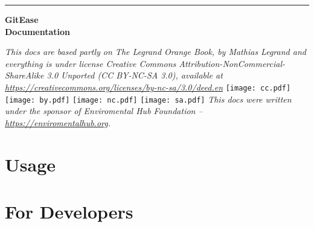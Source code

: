 \documentclass[12pt]{book} %
\begin{document}
\frontmatter

\begin{titlepage} %
	
	\raggedleft %
    \sffamily
    \pagecolor{BlueViolet!55}
    \color{white}
	\rule{3pt}{\textheight} %
	\hspace{0.05\textwidth} %
	\parbox[b]{0.85\textwidth}{ %
		{\fontsize{35}{45}\bfseries GitEase\\[1em] Documentation} %
		
        \vspace{0.5\textheight} %
        
	}

\end{titlepage}

\pagecolor{white}

\rule{0pt}{\textheight}
\newpage
\rule{0pt}{\textheight}
\parbox[b]{0.85\textwidth}{
    \centering
    \emph{This docs are based partly on The Legrand Orange Book, by Mathias Legrand and everything is under license Creative Commons Attribution-NonCommercial-ShareAlike 3.0 Unported (CC BY-NC-SA 3.0), available at \emph{\url{https://creativecommons.org/licenses/by-nc-sa/3.0/deed.en}}}
       \texttt{[image: cc.pdf]} 
       \texttt{[image: by.pdf]} 
       \texttt{[image: nc.pdf]} 
       \texttt{[image: sa.pdf]} 
    \vspace{0.5\textheight} 
    \emph{\vfill This docs were written under the sponsor of Enviromental Hub Foundation -- \emph{\url{https://enviromentalhub.org}}.}
}
\rule{0pt}{\textheight}

\thispagestyle{empty}
\pagebreak


\color{black}
\tableofcontents
\listoffigures
\listoftables

\mainmatter

\part{Usage}

\part{For Developers}
\end{document}
